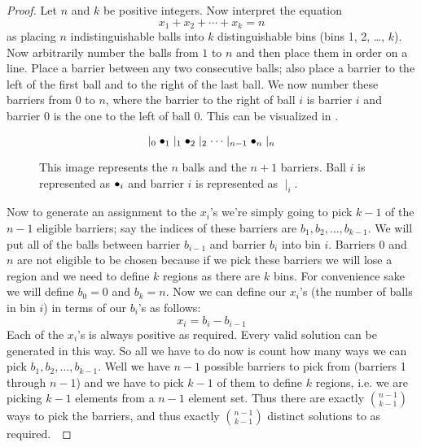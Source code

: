         \begin{proof}
            Let $n$ and $k$ be positive integers. Now interpret the equation
            \begin{equation}
                \label{Pirates and Gold Eqation}
                x_1 + x_2 + \cdots + x_k = n
            \end{equation}
            as placing $n$ indistinguishable balls into $k$ distinguishable bins
            (bins 1, 2, \dots, $k$). Now arbitrarily number the balls from $1$ to $n$ and
            then place them in order on a line. Place a barrier between any two
            consecutive balls; also place a barrier to the left of the first ball and
            to the right of the last ball. We now number these barriers from $0$ to $n$, where
            the barrier to the right of ball $i$ is barrier $i$ and barrier 0 is the
            one to the left of ball $0$. This can be visualized in .
            \begin{figure}[H]
                \centering
                \[
                    \mid_{0} \bullet_1 \mid_1 \bullet_2 \mid_2 \cdots \mid_{n - 1} \bullet_n \mid_{n}
                \]
                \caption{This image represents the $n$ balls and the $n + 1$ barriers. Ball $i$
                         is represented as $\bullet_i$ and barrier $i$ is represented as $\mid_i$.}
                \label{Balls in a Row}
            \end{figure}
            Now to generate an assignment to the $x_i$'s we're simply going to pick $k - 1$
            of the $n - 1$ eligible barriers; say the indices of these barriers are
            $b_1, b_2, \dots, b_{k - 1}$. We will put all of the balls between barrier
            $b_{i - 1}$ and barrier $b_i$ into bin $i$. Barriers 0 and $n$ are not eligible to be
            chosen because if we pick these barriers we will lose a region and we need to define
            $k$ regions as there are $k$ bins. For convenience sake we will define $b_0 = 0$ and
            $b_k = n$. Now we can define our $x_i$'s (the number of balls in bin $i$) in terms
            of our $b_i$'s as follows:
            \begin{equation}
                x_i = b_i - b_{i - 1} 
            \end{equation}
            Each of the $x_i$'s is always positive as required. Every valid solution can be
            generated in this way. So all we have to do now is count how many ways we can pick
            $b_1, b_2, \dots, b_{k - 1}$. Well we have $n - 1$ possible barriers to pick from
            (barriers 1 through $n - 1$) and we have to pick $k - 1$ of them to define $k$ regions,
            i.e. we are picking $k - 1$ elements from a $n - 1$ element set. Thus there are exactly
            $\binom{n - 1}{k - 1}$ ways to pick the barriers, and thus exactly $\binom{n - 1}{k - 1}$
            distinct solutions to  as required.~\QED
        \end{proof}
